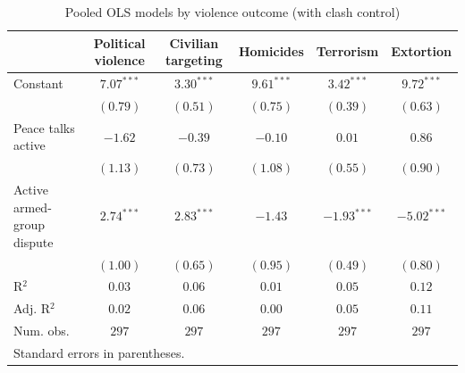 
\begin{table}
\caption{Pooled OLS models by violence outcome (with clash control)}
\begin{center}
\begin{tabular}{l c c c c c}
\toprule
 & Political violence & Civilian targeting & Homicides & Terrorism & Extortion \\
\midrule
Constant                   & $7.07^{***}$ & $3.30^{***}$ & $9.61^{***}$ & $3.42^{***}$  & $9.72^{***}$  \\
                           & $(0.79)$     & $(0.51)$     & $(0.75)$     & $(0.39)$      & $(0.63)$      \\
Peace talks active         & $-1.62$      & $-0.39$      & $-0.10$      & $0.01$        & $0.86$        \\
                           & $(1.13)$     & $(0.73)$     & $(1.08)$     & $(0.55)$      & $(0.90)$      \\
Active armed-group dispute & $2.74^{***}$ & $2.83^{***}$ & $-1.43$      & $-1.93^{***}$ & $-5.02^{***}$ \\
                           & $(1.00)$     & $(0.65)$     & $(0.95)$     & $(0.49)$      & $(0.80)$      \\
\midrule
R$^2$                      & $0.03$       & $0.06$       & $0.01$       & $0.05$        & $0.12$        \\
Adj. R$^2$                 & $0.02$       & $0.06$       & $0.00$       & $0.05$        & $0.11$        \\
Num. obs.                  & $297$        & $297$        & $297$        & $297$         & $297$         \\
\bottomrule
\multicolumn{6}{l}{\scriptsize{Standard errors in parentheses.}}
\end{tabular}
\label{tab:violence_ols}
\end{center}
\end{table}
